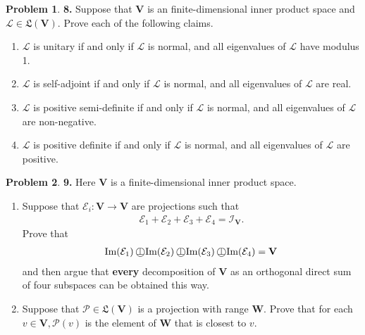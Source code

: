 \documentclass{book}
\theoremstyle{definition}
\newtheorem*{prob*}{Problem}
\newcommand{\V}{\mathbf{V}}
\newcommand{\W}{\mathbf{W}}
\newcommand*{\operp}{\perp\mkern-20.7mu\bigcirc}
\newcommand{\lag}{\mathcal{L}}
\newcommand{\E}{\mathcal{E}}
\newcommand{\ima}{\text{Im}}
\newcommand{\LL}{\mathfrak{L}}
\newcommand{\id}{\mathcal{I}}
\begin{document}
\begin{prob*}\textbf{8.} Suppose that $\V$ is an finite-dimensional inner product space and $\lag \in \LL(\V)$. Prove each of the following claims.
	\begin{enumerate}
		\item $\lag$ is unitary if and only if $\lag$ is normal, and all eigenvalues of $\lag$ have modulus 1.
		\item $\lag$ is self-adjoint if and only if $\lag$ is normal, and all eigenvalues of $\lag$ are real.
		\item $\lag$ is positive semi-definite if and only if $\lag$ is normal, and all eigenvalues of $\lag$ are non-negative. 
		\item $\lag$ is positive definite if and only if $\lag$ is normal, and all eigenvalues of $\lag$ are positive. 
	\end{enumerate}
	
\end{prob*}




\newpage



\begin{prob*}\textbf{9.} Here $\V$ is a finite-dimensional inner product space. 
	\begin{enumerate}
		\item Suppose that $\E_i : \V \to \V$ are projections such that 
		\begin{align*}
		\E_1 + \E_2 + \E_3 + \E_4 = \id_\V.
		\end{align*}
		Prove that 
		\begin{align*}
		\ima(\E_1) \operp \ima(\E_2) \operp \ima(\E_3) \operp \ima(\E_4) = \V
		\end{align*}
		and then argue that \textbf{every} decomposition of $\V$ as an orthogonal direct sum of four subspaces can be obtained this way.
		
		
		
		\item Suppose that $\mathcal{P} \in \LL(\V)$ is a projection with range $\W$. Prove that for each $v \in \V, \mathcal{P}(v)$ is the element of $\W$ that is closest to $v$. 
	\end{enumerate}



	
\end{prob*}



\newpage
\end{document}
